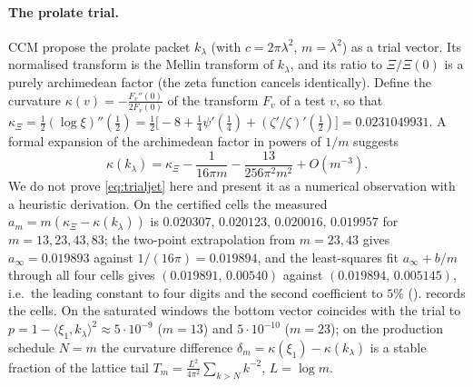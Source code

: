 \paragraph{The prolate trial.} CCM \cite[\S7]{CCM-ZST-2025} propose the prolate packet $k_\lambda$ (with $c=2\pi\lambda^2$, $m=\lambda^2$)
as a trial vector. Its normalised transform is the Mellin transform of $k_\lambda$, and its ratio to $\Xi/\Xi(0)$ is a purely archimedean
factor (the zeta function cancels identically). Define the curvature $\kappa(v)=-\frac{F_v''(0)}{2F_v(0)}$ of the transform $F_v$ of a test $v$,
so that $\kappa_\Xi=\tfrac12(\log\xi)''(\tfrac12)=\tfrac12\bigl[-8+\tfrac14\psi'(\tfrac14)+(\zeta'/\zeta)'(\tfrac12)\bigr]=0.0231049931$.
A formal expansion of the archimedean factor in powers of $1/m$ suggests
\begin{equation}\label{eq:trialjet}
 \kappa(k_\lambda)=\kappa_\Xi-\frac{1}{16\pi m}-\frac{13}{256\pi^2m^2}+O(m^{-3}).
\end{equation}
We do not prove \eqref{eq:trialjet} here and present it as a numerical observation with a heuristic derivation. On the certified cells the
measured $a_m=m(\kappa_\Xi-\kappa(k_\lambda))$ is $0.020307,\,0.020123,\,0.020016,\,0.019957$ for $m=13,23,43,83$; the two-point extrapolation
from $m=23,43$ gives $a_\infty=0.019893$ against $1/(16\pi)=0.019894$, and the least-squares fit $a_\infty+b/m$ through all four cells gives
$(0.019891,\,0.00540)$ against $(0.019894,\,0.005145)$, i.e.\ the leading constant to four digits and the second coefficient to $5\%$
().  records the cells. On the saturated windows the bottom vector coincides with the trial to
$p=1-\langle\xi_1,k_\lambda\rangle^2\approx5\cdot10^{-9}$ ($m=13$) and $5\cdot10^{-10}$ ($m=23$); on the production schedule $N=m$ the
curvature difference $\delta_m=\kappa(\xi_1)-\kappa(k_\lambda)$ is a stable fraction of the lattice tail
$T_m=\frac{L^2}{4\pi^2}\sum_{k>N}k^{-2}$, $L=\log m$.

